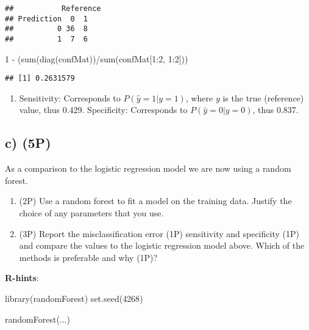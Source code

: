 \documentclass[
]{article}
\newenvironment{Shaded}{\begin{snugshade}}{\end{snugshade}}
\newcommand{\DecValTok}[1]{\textcolor[rgb]{0.00,0.00,0.81}{#1}}
\newcommand{\FunctionTok}[1]{\textcolor[rgb]{0.00,0.00,0.00}{#1}}
\newcommand{\NormalTok}[1]{#1}
\newcommand{\SpecialCharTok}[1]{\textcolor[rgb]{0.00,0.00,0.00}{#1}}
\providecommand{\tightlist}{%
  \setlength{\itemsep}{0pt}\setlength{\parskip}{0pt}}
\begin{document}
\begin{verbatim}
##           Reference
## Prediction  0  1
##          0 36  8
##          1  7  6
\end{verbatim}

\begin{Shaded}
\begin{Highlighting}[]
\DecValTok{1} \SpecialCharTok{{-}}\NormalTok{ (}\FunctionTok{sum}\NormalTok{(}\FunctionTok{diag}\NormalTok{(confMat))}\SpecialCharTok{/}\FunctionTok{sum}\NormalTok{(confMat[}\DecValTok{1}\SpecialCharTok{:}\DecValTok{2}\NormalTok{, }\DecValTok{1}\SpecialCharTok{:}\DecValTok{2}\NormalTok{]))}
\end{Highlighting}
\end{Shaded}

\begin{verbatim}
## [1] 0.2631579
\end{verbatim}

\begin{enumerate}
\def\labelenumi{(\roman{enumi})}
\setcounter{enumi}{2}
\tightlist
\item
  Sensitivity: Corresponds to \(P(\hat{y}=1 | y=1)\), where \(y\) is the
  true (reference) value, thus 0.429. Specificity: Corresponds to
  \(P(\hat{y}=0 | y=0)\), thus 0.837.
\end{enumerate}

\hypertarget{c-5p}{%
\subsection{c) (5P)}\label{c-5p}}

As a comparison to the logistic regression model we are now using a
random forest.

\begin{enumerate}
\def\labelenumi{(\roman{enumi})}
\tightlist
\item
  (2P) Use a random forest to fit a model on the training data. Justify
  the choice of any parameters that you use.
\item
  (3P) Report the misclassification error (1P) sensitivity and
  specificity (1P) and compare the values to the logistic regression
  model above. Which of the methods is preferable and why (1P)?
\end{enumerate}

\textbf{R-hints}:

\begin{Shaded}
\begin{Highlighting}[]
\FunctionTok{library}\NormalTok{(randomForest)}
\FunctionTok{set.seed}\NormalTok{(}\DecValTok{4268}\NormalTok{)}

\FunctionTok{randomForest}\NormalTok{(...)}
\end{Highlighting}
\end{Shaded}
\end{document}
